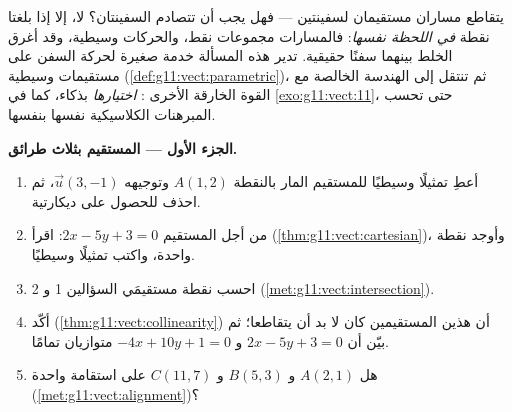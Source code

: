 \begin{problem}
\label{pb:g11:vect:1}
يتقاطع مساران مستقيمان لسفينتين --- فهل يجب أن تتصادم السفينتان؟ لا،
إلا إذا بلغتا نقطة  \emph{في اللحظة نفسها}: فالمسارات
مجموعات نقط، والحركات وسيطية، وقد أغرق الخلط بينهما
سفنًا حقيقية. تدير هذه المسألة خدمة صغيرة لحركة السفن
على مستقيمات وسيطية (\cref{def:g11:vect:parametric})، ثم تنتقل
إلى الهندسة الخالصة مع القوة الخارقة الأخرى :
\emph{اختيارها} بذكاء، كما في \cref{exo:g11:vect:11}، حتى
تحسب المبرهنات الكلاسيكية نفسها بنفسها.

\medskip
\noindent\textbf{الجزء الأول --- المستقيم بثلاث طرائق.}
\begin{enumerate}
  \item أعطِ تمثيلًا وسيطيًا للمستقيم المار بالنقطة
        $A(1, 2)$ وتوجيهه $\vec u(3, -1)$، ثم
        احذف  للحصول على  ديكارتية.
  \item من أجل المستقيم $2x - 5y + 3 = 0$: اقرأ 
        (\cref{thm:g11:vect:cartesian})، وأوجد نقطة واحدة،
        واكتب تمثيلًا وسيطيًا.
  \item احسب نقطة  مستقيمَي
        السؤالين 1 و 2 (\cref{met:g11:vect:intersection}).
  \item أكّد 
        (\cref{thm:g11:vect:collinearity}) أن هذين المستقيمين
        كان لا بد أن يتقاطعا؛ ثم بيّن أن $2x - 5y + 3 = 0$ و
        $-4x + 10y + 1 = 0$ متوازيان تمامًا.
  \item هل $A(2, 1)$ و $B(5, 3)$ و $C(11, 7)$ على استقامة واحدة
        (\cref{met:g11:vect:alignment})؟
\end{enumerate}


\end{problem}
